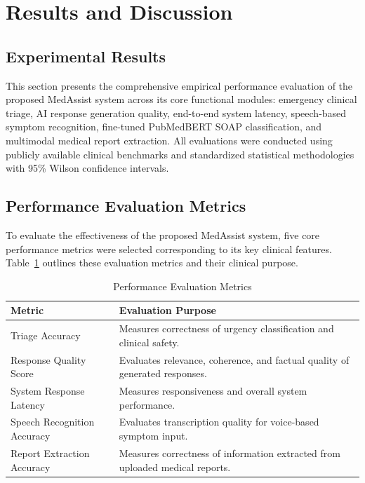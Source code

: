 
\section{Results and Discussion}

\subsection{Experimental Results}

This section presents the comprehensive empirical performance evaluation of the proposed MedAssist system across its core functional modules: emergency clinical triage, AI response generation quality, end-to-end system latency, speech-based symptom recognition, fine-tuned PubMedBERT SOAP classification, and multimodal medical report extraction. All evaluations were conducted using publicly available clinical benchmarks and standardized statistical methodologies with 95\% Wilson confidence intervals.

\subsection{Performance Evaluation Metrics}

To evaluate the effectiveness of the proposed MedAssist system, five core performance metrics were selected corresponding to its key clinical features. Table~\ref{tab:evaluation_metrics} outlines these evaluation metrics and their clinical purpose.

\begin{table}[ht]
\centering
\caption{Performance Evaluation Metrics}
\label{tab:evaluation_metrics}
\begin{tabular}{|>{\raggedright\arraybackslash}p{}|>{\raggedright\arraybackslash}p{}|}
\hline
\textbf{Metric} & \textbf{Evaluation Purpose} \\
\hline
Triage Accuracy & Measures correctness of urgency classification and clinical safety. \\
\hline
Response Quality Score & Evaluates relevance, coherence, and factual quality of generated responses. \\
\hline
System Response Latency & Measures responsiveness and overall system performance. \\
\hline
Speech Recognition Accuracy & Evaluates transcription quality for voice-based symptom input. \\
\hline
Report Extraction Accuracy & Measures correctness of information extracted from uploaded medical reports. \\
\hline
\end{tabular}
\end{table}

